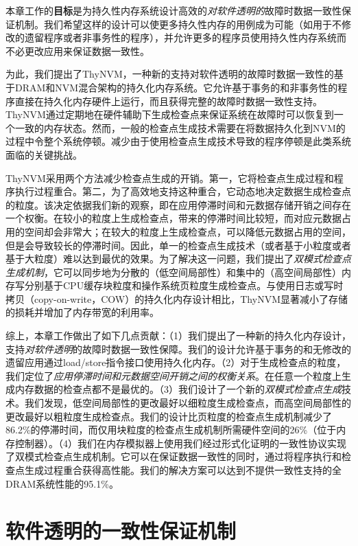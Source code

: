 本章工作的\textbf{目标}是为持久性内存系统设计高效的\emph{对软件透明的}故障时数据一致性保证机制。我们希望这样的设计可以使更多持久性内存的用例成为可能（如用于不修改的遗留程序或者非事务性的程序），并允许更多的程序员使用持久性内存系统而不必更改应用来保证数据一致性。

为此，我们提出了ThyNVM，一种新的支持对软件透明的故障时数据一致性的基于DRAM和NVM混合架构的持久化内存系统。它允许基于事务的和非事务性的程序直接在持久化内存硬件上运行，而且获得完整的故障时数据一致性支持。ThyNVM通过定期地在硬件辅助下生成检查点来保证系统在故障时可以恢复到一个一致的内存状态。然而，一般的检查点生成技术需要在将数据持久化到NVM的过程中令整个系统停顿。减少由于使用检查点生成技术导致的程序停顿是此类系统面临的关键挑战。

ThyNVM采用两个方法减少检查点生成的开销。第一，它将检查点生成过程和程序执行过程重合。第二，为了高效地支持这种重合，它动态地决定数据生成检查点的粒度。该决定依据我们新的观察，即在应用停滞时间和元数据存储开销之间存在一个权衡。在较小的粒度上生成检查点，带来的停滞时间比较短，而对应元数据占用的空间却会非常大；在较大的粒度上生成检查点，可以降低元数据占用的空间，但是会导致较长的停滞时间。因此，单一的检查点生成技术（或者基于小粒度或者基于大粒度）难以达到最优的效果。为了解决这一问题，我们提出了\emph{双模式检查点生成机制}，它可以同步地为分散的（低空间局部性）和集中的（高空间局部性）内存写分别基于CPU缓存块粒度和操作系统页粒度生成检查点。与使用日志\cite{Volos:2011:MLP:1950365.1950379, Coburn:2011:NMP:1950365.1950380}或写时拷贝（copy-on-write，COW）\cite{Condit:2009:BIT:1629575.1629589, Venkataraman:2011:CDD:1960475.1960480}的持久化内存设计相比，ThyNVM显著减小了存储的损耗并增加了内存带宽的利用率。

综上，本章工作做出了如下几点贡献：（1）我们提出了一种新的持久化内存设计，支持\emph{对软件透明}的故障时数据一致性保障。我们的设计允许基于事务的和无修改的遗留应用通过load/store指令接口使用持久化内存。（2）对于生成检查点的粒度，我们定位了\emph{应用停滞时间和元数据空间开销之间的权衡关系}。在任意一个粒度上生成内存数据的检查点都不是最优的。（3）我们设计了一个新的\emph{双模式检查点生成}技术。我们发现，低空间局部性的更改最好以细粒度生成检查点，而高空间局部性的更改最好以粗粒度生成检查点。我们的设计比页粒度的检查点生成机制减少了86.2\%的停滞时间，而仅用块粒度的检查点生成机制所需硬件空间的26\%（位于内存控制器）。（4）我们在内存模拟器上使用我们经过形式化证明的一致性协议实现了双模式检查点生成机制。它可以在保证数据一致性的同时，通过将程序执行和检查点生成过程重合获得高性能。我们的解决方案可以达到不提供一致性支持的全DRAM系统性能的95.1\%。

\section{软件透明的一致性保证机制}

